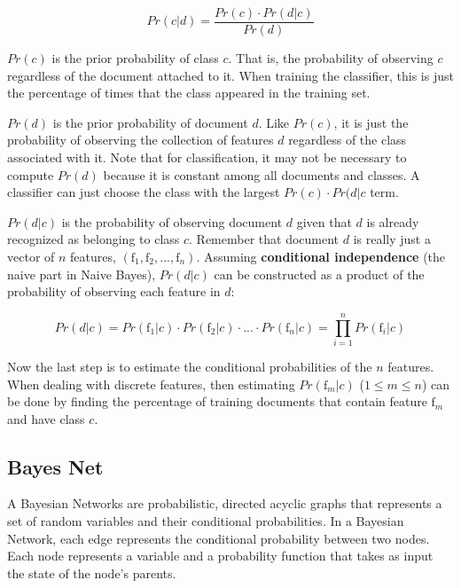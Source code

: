\documentclass[12pt]{ucthesis}
\begin{document}
\begin{equation}
   Pr(c|d) = \frac{Pr(c) \cdot Pr(d|c)}{Pr(d)}
\end{equation}

$Pr(c)$ is the \textsf{prior probability} of class $c$. That is, the probability of
observing $c$ regardless of the document attached to it. When training the classifier, this
is just the percentage of times that the class appeared in the training set.

$Pr(d)$ is the \textsf{prior probability} of document $d$. Like $Pr(c)$, it is just the
probability of observing the collection of features $d$ regardless of the class associated with it.
Note that for classification, it may not be necessary to compute $Pr(d)$ because it is constant among all
documents and classes. A classifier can just choose the class with the largest $Pr(c) \cdot Pr(d|c$ term.

$Pr(d|c)$ is the probability of observing document $d$ given that $d$ is already recognized as belonging to
class $c$. Remember that document $d$ is really just a vector of $n$ features, $(\textrm{f}_{1}, \textrm{f}_{2}, ..., \textrm{f}_{n})$.
Assuming \textbf{conditional independence} (the \textsf{naive} part in Naive Bayes), $Pr(d|c)$ can be
constructed as a product of the probability of observing each feature in $d$:

\begin{equation}
   Pr(d|c) = Pr(\textrm{f}_{1}|c) \cdot Pr(\textrm{f}_{2}|c) \cdot ... \cdot Pr(\textrm{f}_{n}|c) = \prod_{i = 1}^{n}Pr(\textrm{f}_{i}|c)
\end{equation}

Now the last step is to estimate the conditional probabilities of the $n$ features.
When dealing with discrete features, then estimating $Pr(\textrm{f}_{m}|c)$ ($1 \leq m \leq n$) can be done by
finding the percentage of training documents that contain feature $\textrm{f}_{m}$ and have class $c$.

\subsection{Bayes Net}
\label{background-classification-classifiers-bayes-net}
A Bayesian Networks are probabilistic, directed acyclic graphs that represents a set of random variables and their conditional probabilities.
In a Bayesian Network, each edge represents the conditional probability between two nodes. Each node represents a variable and a probability
function that takes as input the state of the node's parents.\cite{Pearl}\cite{Neapolitan}
\end{document}
